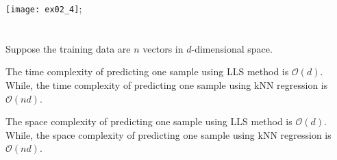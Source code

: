 \documentclass{article}[11pt]
\begin{document}
\begin{center}
  \texttt{[image: ex02\_4]};
\end{center}

\section{}
Suppose the training data are $n$ vectors in $d$-dimensional space.

The time complexity of predicting one sample using LLS method is $\mathcal{O}(d)$.
While, the time complexity of predicting one sample using kNN regression is $\mathcal{O}(nd)$.

The space complexity of predicting one sample using LLS method is $\mathcal{O}(d)$.
While, the space complexity of predicting one sample using kNN regression is $\mathcal{O}(nd)$.
\end{document}
